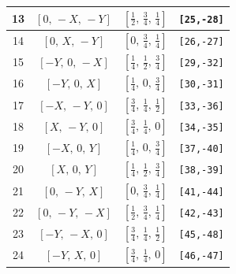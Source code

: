 \documentclass[fleqn,8pt]{jsarticle}
\begin{document}
\begin{longtable}{cccc}
13 & $\left[ 0,\, - X,\, - Y \right]$ & $\left[ \frac{1}{2},\, \frac{3}{4},\, \frac{1}{4} \right]$ & {\tt [25,-28]} \\ \hline
14 & $\left[ 0,\, X,\, - Y \right]$ & $\left[ 0,\, \frac{3}{4},\, \frac{1}{4} \right]$ & {\tt [26,-27]} \\ \hline
15 & $\left[ - Y,\, 0,\, - X \right]$ & $\left[ \frac{1}{4},\, \frac{1}{2},\, \frac{3}{4} \right]$ & {\tt [29,-32]} \\ \hline
16 & $\left[ - Y,\, 0,\, X \right]$ & $\left[ \frac{1}{4},\, 0,\, \frac{3}{4} \right]$ & {\tt [30,-31]} \\ \hline
17 & $\left[ - X,\, - Y,\, 0 \right]$ & $\left[ \frac{3}{4},\, \frac{1}{4},\, \frac{1}{2} \right]$ & {\tt [33,-36]} \\ \hline
18 & $\left[ X,\, - Y,\, 0 \right]$ & $\left[ \frac{3}{4},\, \frac{1}{4},\, 0 \right]$ & {\tt [34,-35]} \\ \hline
19 & $\left[ - X,\, 0,\, Y \right]$ & $\left[ \frac{1}{4},\, 0,\, \frac{3}{4} \right]$ & {\tt [37,-40]} \\ \hline
20 & $\left[ X,\, 0,\, Y \right]$ & $\left[ \frac{1}{4},\, \frac{1}{2},\, \frac{3}{4} \right]$ & {\tt [38,-39]} \\ \hline
21 & $\left[ 0,\, - Y,\, X \right]$ & $\left[ 0,\, \frac{3}{4},\, \frac{1}{4} \right]$ & {\tt [41,-44]} \\ \hline
22 & $\left[ 0,\, - Y,\, - X \right]$ & $\left[ \frac{1}{2},\, \frac{3}{4},\, \frac{1}{4} \right]$ & {\tt [42,-43]} \\ \hline
23 & $\left[ - Y,\, - X,\, 0 \right]$ & $\left[ \frac{3}{4},\, \frac{1}{4},\, \frac{1}{2} \right]$ & {\tt [45,-48]} \\ \hline
24 & $\left[ - Y,\, X,\, 0 \right]$ & $\left[ \frac{3}{4},\, \frac{1}{4},\, 0 \right]$ & {\tt [46,-47]} \\
\end{longtable}
\renewcommand{\arraystretch}{1.2}
\end{document}
